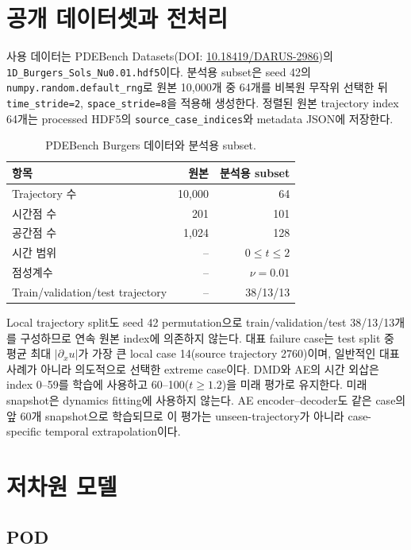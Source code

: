 \documentclass[11pt,a4paper]{article}
\begin{document}
\section{공개 데이터셋과 전처리}

사용 데이터는 PDEBench Datasets(DOI: \href{https://doi.org/10.18419/DARUS-2986}{10.18419/DARUS-2986})의 \texttt{1D\_Burgers\_Sols\_Nu0.01.hdf5}이다. 분석용 subset은 seed 42의 \texttt{numpy.random.default\_rng}로 원본 10,000개 중 64개를 비복원 무작위 선택한 뒤 \texttt{time\_stride=2}, \texttt{space\_stride=8}을 적용해 생성한다. 정렬된 원본 trajectory index 64개는 processed HDF5의 \texttt{source\_case\_indices}와 metadata JSON에 저장한다.

\begin{table}[H]
\centering
\caption{PDEBench Burgers 데이터와 분석용 subset.}
\begin{tabular}{lrr}
\toprule
항목 & 원본 & 분석용 subset \\
\midrule
Trajectory 수 & 10,000 & 64 \\
시간점 수 & 201 & 101 \\
공간점 수 & 1,024 & 128 \\
시간 범위 & -- & $0\le t\le2$ \\
점성계수 & -- & $\nu=0.01$ \\
Train/validation/test trajectory & -- & 38/13/13 \\
\bottomrule
\end{tabular}
\end{table}

Local trajectory split도 seed 42 permutation으로 train/validation/test 38/13/13개를 구성하므로 연속 원본 index에 의존하지 않는다. 대표 failure case는 test split 중 평균 최대 $|\partial_xu|$가 가장 큰 local case 14(source trajectory 2760)이며, 일반적인 대표 사례가 아니라 의도적으로 선택한 extreme case이다. DMD와 AE의 시간 외삽은 index 0--59를 학습에 사용하고 60--100($t\ge1.2$)을 미래 평가로 유지한다. 미래 snapshot은 dynamics fitting에 사용하지 않는다. AE encoder--decoder도 같은 case의 앞 60개 snapshot으로 학습되므로 이 평가는 unseen-trajectory가 아니라 case-specific temporal extrapolation이다.

\section{저차원 모델}

\subsection{POD}
\end{document}
